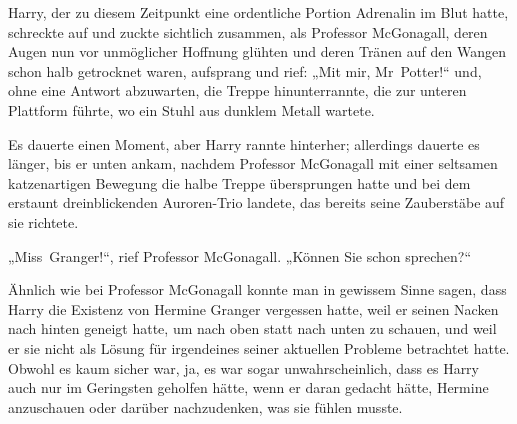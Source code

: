 Harry, der zu diesem Zeitpunkt eine ordentliche Portion Adrenalin im Blut hatte, schreckte auf und zuckte sichtlich zusammen, als Professor McGonagall, deren Augen nun vor unmöglicher Hoffnung glühten und deren Tränen auf den Wangen schon halb getrocknet waren, aufsprang und rief:
„Mit mir, Mr~Potter!“ und, ohne eine Antwort abzuwarten, die Treppe hinunterrannte, die zur unteren Plattform führte, wo ein Stuhl aus dunklem Metall wartete.

Es dauerte einen Moment, aber Harry rannte hinterher; allerdings dauerte es länger, bis er unten ankam, nachdem Professor McGonagall mit einer seltsamen katzenartigen Bewegung die halbe Treppe übersprungen hatte und bei dem erstaunt dreinblickenden Auroren-Trio landete, das bereits seine Zauberstäbe auf sie richtete.

„Miss~Granger!“, rief Professor McGonagall.
„Können Sie schon sprechen?“

Ähnlich wie bei Professor McGonagall konnte man in gewissem Sinne sagen, dass Harry die Existenz von Hermine Granger vergessen hatte, weil er seinen Nacken nach hinten geneigt hatte, um nach oben statt nach unten zu schauen, und weil er sie nicht als Lösung für irgendeines seiner aktuellen Probleme betrachtet hatte. Obwohl es kaum sicher war, ja, es war sogar unwahrscheinlich, dass es Harry auch nur im Geringsten geholfen hätte, wenn er daran gedacht hätte, Hermine anzuschauen oder darüber nachzudenken, was sie fühlen musste.

